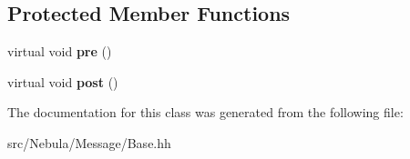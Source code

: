 \subsection*{Protected Member Functions}
\begin{DoxyCompactItemize}
\item 
\hypertarget{classNeb_1_1Message_1_1Base_a76f71f917625ae6da29f1372443c857f}{virtual void {\bfseries pre} ()}\label{classNeb_1_1Message_1_1Base_a76f71f917625ae6da29f1372443c857f}

\item 
\hypertarget{classNeb_1_1Message_1_1Base_ab1e20f766088e782e01cfb8208fdb4ac}{virtual void {\bfseries post} ()}\label{classNeb_1_1Message_1_1Base_ab1e20f766088e782e01cfb8208fdb4ac}

\end{DoxyCompactItemize}


The documentation for this class was generated from the following file\-:\begin{DoxyCompactItemize}
\item 
src/\-Nebula/\-Message/Base.\-hh\end{DoxyCompactItemize}
